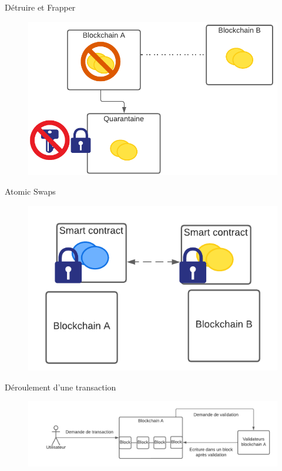 \begin{frame}{Détruire et Frapper}
    \begin{figure}
        \centering
        \includegraphics[scale = 0.7]{centralisation/img_bridges/BurnAndMint.png}
    \end{figure}
\end{frame}

\begin{frame}{Atomic Swaps}
    \begin{figure}
        \centering
        \includegraphics[scale = 1]{centralisation/img_bridges/AtomicSwap.png}
    \end{figure}
\end{frame}

\begin{frame}{Déroulement d'une transaction}
    \begin{figure}
        \centering
        \includegraphics[scale = 0.6]{centralisation/img_bridges/Transaction1.png}
    \end{figure}
\end{frame}

